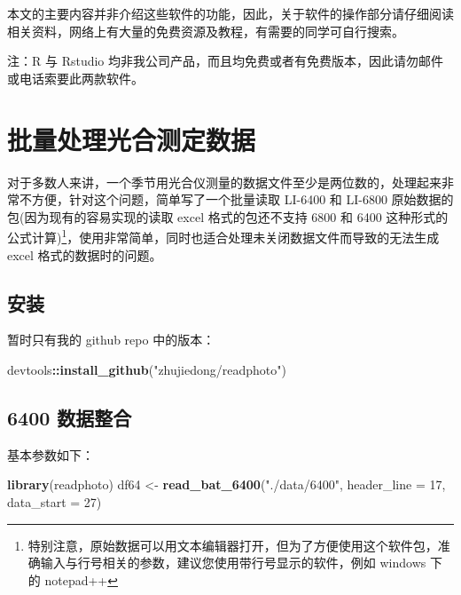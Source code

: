 \documentclass[
]{krantz}
\makeatletter
\newenvironment{Shaded}{\begin{snugshade}}{\end{snugshade}}
\newcommand{\DataTypeTok}[1]{\textcolor[rgb]{0.13,0.29,0.53}{#1}}
\newcommand{\DecValTok}[1]{\textcolor[rgb]{0.00,0.00,0.81}{#1}}
\newcommand{\KeywordTok}[1]{\textcolor[rgb]{0.13,0.29,0.53}{\textbf{#1}}}
\newcommand{\NormalTok}[1]{#1}
\newcommand{\OperatorTok}[1]{\textcolor[rgb]{0.81,0.36,0.00}{\textbf{#1}}}
\newcommand{\StringTok}[1]{\textcolor[rgb]{0.31,0.60,0.02}{#1}}
\renewenvironment{quote}{\begin{VF}}{\end{VF}}
\newenvironment{kframe}{%
\medskip{}
\setlength{\fboxsep}{.8em}
 \def\at@end@of@kframe{}%
 \ifinner\ifhmode%
  \def\at@end@of@kframe{\end{minipage}}%
  \begin{minipage}{\columnwidth}%
 \fi\fi%
 \def\FrameCommand##1{\hskip\@totalleftmargin \hskip-\fboxsep
 \colorbox{shadecolor}{##1}\hskip-\fboxsep
     \hskip-\linewidth \hskip-\@totalleftmargin \hskip\columnwidth}%
 \MakeFramed {\advance\hsize-\width
   \@totalleftmargin\z@ \linewidth\hsize
   \@setminipage}}%
 {\par\unskip\endMakeFramed%
 \at@end@of@kframe}
\renewenvironment{Shaded}{\begin{kframe}}{\end{kframe}}
\makeatother
\begin{document}
本文的主要内容并非介绍这些软件的功能，因此，关于软件的操作部分请仔细阅读相关资料，网络上有大量的免费资源及教程，有需要的同学可自行搜索。

\begin{quote}
注：R 与 Rstudio 均非我公司产品，而且均免费或者有免费版本，因此请勿邮件或电话索要此两款软件。
\end{quote}

\cleardoublepage

\hypertarget{batch_question}{%
\chapter{批量处理光合测定数据}\label{batch_question}}

对于多数人来讲，一个季节用光合仪测量的数据文件至少是两位数的，处理起来非常不方便，针对这个问题，简单写了一个批量读取 LI-6400 和 LI-6800 原始数据的包(因为现有的容易实现的读取 excel 格式的包还不支持 6800 和 6400 这种形式的公式计算)\footnote{特别注意，原始数据可以用文本编辑器打开，但为了方便使用这个软件包，准确输入与行号相关的参数，建议您使用带行号显示的软件，例如 windows 下的 notepad++}，使用非常简单，同时也适合处理未关闭数据文件而导致的无法生成 excel 格式的数据时的问题。

\hypertarget{install_readphoto}{%
\section{安装}\label{install_readphoto}}

暂时只有我的 github repo 中的版本：

\begin{Shaded}
\begin{Highlighting}[]
\NormalTok{devtools}\OperatorTok{::}\KeywordTok{install\_github}\NormalTok{(}\StringTok{"zhujiedong/readphoto"}\NormalTok{)}
\end{Highlighting}
\end{Shaded}

\hypertarget{batch64}{%
\section{6400 数据整合}\label{batch64}}

基本参数如下：

\begin{Shaded}
\begin{Highlighting}[]
\KeywordTok{library}\NormalTok{(readphoto)}
\NormalTok{df64  \textless{}{-}}\StringTok{ }\KeywordTok{read\_bat\_6400}\NormalTok{(}\StringTok{"./data/6400"}\NormalTok{, }\DataTypeTok{header\_line =} \DecValTok{17}\NormalTok{, }\DataTypeTok{data\_start =} \DecValTok{27}\NormalTok{)}
\end{Highlighting}
\end{Shaded}
\end{document}
